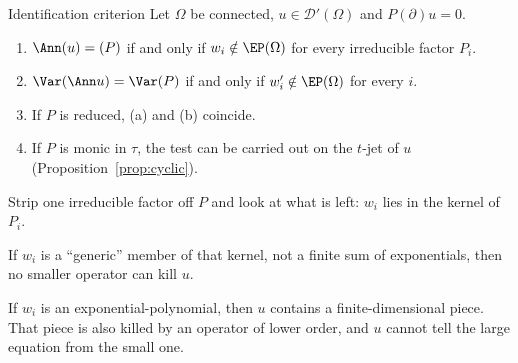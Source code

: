 \begin{theorem}{Identification criterion  \proved}\label{thm:ident}
Let $\Omega$ be connected, $u\in\mathcal D'(\Omega)$ and $P(\partial)u=0$.
\begin{enumerate}[label=(\alph*)]
\item $\Ann(u)=(P)$ if and only if $w_i\notin\EP(\Omega)$ for every irreducible factor $P_i$.
\item $\Var(\Ann u)=\Var(P)$ if and only if $w_i'\notin\EP(\Omega)$ for every $i$.
\item If $P$ is reduced, (a) and (b) coincide.
\item If $P$ is monic in $\tau$, the test can be carried out on the $t$-jet of $u$ (Proposition~\ref{prop:cyclic}).
\end{enumerate}
\end{theorem}

\begin{intuition}
Strip one irreducible factor off $P$ and look at what is left: $w_i$ lies in the kernel of $P_i$.

If $w_i$ is a ``generic'' member of that kernel, not a finite sum of exponentials, then no smaller operator can kill $u$.

If $w_i$ is an exponential-polynomial, then $u$ contains a finite-dimensional piece. That piece is also killed by an operator of lower order, and $u$ cannot tell the large equation from the small one.
\end{intuition}

